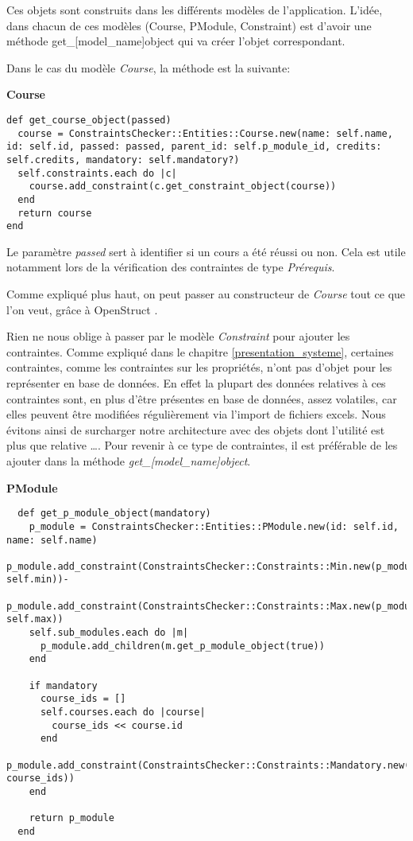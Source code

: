 Ces objets sont construits dans les différents modèles de l'application. L'idée, dans chacun de ces modèles (Course, PModule, Constraint) est d'avoir une méthode get\_[model\_name]object qui va créer l'objet correspondant.

Dans le cas du modèle \textit{Course}, la méthode est la suivante:


\textbf{Course}

\begin{lstlisting}
def get_course_object(passed)
  course = ConstraintsChecker::Entities::Course.new(name: self.name, id: self.id, passed: passed, parent_id: self.p_module_id, credits: self.credits, mandatory: self.mandatory?)
  self.constraints.each do |c|
    course.add_constraint(c.get_constraint_object(course))
  end
  return course
end
\end{lstlisting}


Le paramètre \textit{passed} sert à identifier si un cours a été réussi ou non. Cela est utile notamment lors de la vérification des contraintes de type \textit{Prérequis}.

Comme expliqué plus haut, on peut passer au constructeur de \textit{Course} tout ce que l'on veut, grâce à OpenStruct \cite{OpenStruct}.

Rien ne nous oblige à passer par le modèle \textit{Constraint} pour ajouter les contraintes. Comme expliqué dans le chapitre \ref{presentation_systeme}, certaines contraintes, comme les contraintes sur les propriétés,  n'ont pas d'objet pour les représenter en base de données. En effet la plupart des données relatives à ces contraintes sont, en plus d'être présentes en base de données, assez volatiles, car elles peuvent être modifiées régulièrement via l'import de fichiers excels. Nous évitons ainsi de surcharger notre architecture avec des objets dont l'utilité est plus que relative \ldots. Pour revenir à ce type de contraintes, il est préférable de les ajouter dans la méthode \textit{get\_[model\_name]object}.

\textbf{PModule}

\begin{lstlisting}
  def get_p_module_object(mandatory)
    p_module = ConstraintsChecker::Entities::PModule.new(id: self.id, name: self.name)
    p_module.add_constraint(ConstraintsChecker::Constraints::Min.new(p_module, self.min))-
    p_module.add_constraint(ConstraintsChecker::Constraints::Max.new(p_module, self.max))
    self.sub_modules.each do |m|
      p_module.add_children(m.get_p_module_object(true))
    end

    if mandatory
      course_ids = []
      self.courses.each do |course|
        course_ids << course.id
      end
      p_module.add_constraint(ConstraintsChecker::Constraints::Mandatory.new(p_module, course_ids))
    end

    return p_module
  end
\end{lstlisting}

